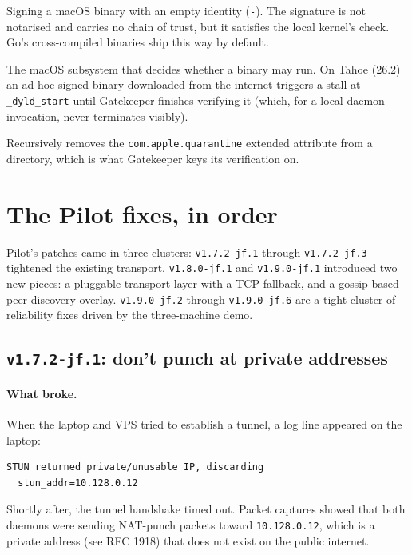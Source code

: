 \documentclass[11pt,a4paper]{article}
\begin{document}
\begin{description}[leftmargin=1em,style=nextline]
    \item[\textbf{Ad-hoc code signing.}]
    Signing a macOS binary with an empty identity (\texttt{-}).
    The signature is not notarised and carries no chain of
    trust, but it satisfies the local kernel's check. Go's
    cross-compiled binaries ship this way by default.
    \item[\textbf{Gatekeeper.}]
    The macOS subsystem that decides whether a binary may run.
    On Tahoe (26.2) an ad-hoc-signed binary downloaded from the
    internet triggers a stall at \texttt{\_dyld\_start} until
    Gatekeeper finishes verifying it (which, for a local daemon
    invocation, never terminates visibly).
    \item[\textbf{\texttt{xattr -cr}.}]
    Recursively removes the \texttt{com.apple.quarantine}
    extended attribute from a directory, which is what Gatekeeper
    keys its verification on.
\end{description}

\section{The Pilot fixes, in order}
\label{sec:pilot}

Pilot's patches came in three clusters:
\texttt{v1.7.2-jf.1} through \texttt{v1.7.2-jf.3} tightened the
existing transport. \texttt{v1.8.0-jf.1} and \texttt{v1.9.0-jf.1}
introduced two new pieces: a pluggable transport layer with a TCP
fallback, and a gossip-based peer-discovery overlay.
\texttt{v1.9.0-jf.2} through \texttt{v1.9.0-jf.6} are a tight
cluster of reliability fixes driven by the three-machine demo.

\subsection{\texttt{v1.7.2-jf.1}: don't punch at private addresses}

\paragraph{What broke.} When the laptop and VPS tried to
establish a tunnel, a log line appeared on the laptop:
\begin{lstlisting}
STUN returned private/unusable IP, discarding
  stun_addr=10.128.0.12
\end{lstlisting}
Shortly after, the tunnel handshake timed out. Packet captures
showed that both daemons were sending NAT-punch packets toward
\texttt{10.128.0.12}, which is a private address (see RFC 1918)
that does not exist on the public internet.
\end{document}
